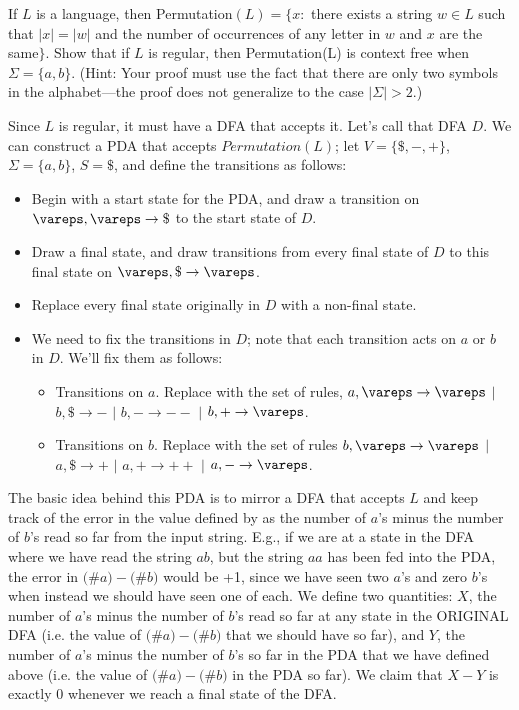 \documentclass[solution, letterpaper]{cs121}
\begin{document}
If $L$ is a language, then {\sc Permutation}$(L) = \{ x:
$ there exists a string $w \in L$ such that $|x|=|w|$ and the number
of occurrences of any letter in $w$ and $x$ are the same$\}$. Show
that if $L$ is regular, then {\sc Permutation}(L) is context free
when $\Sigma = \{a, b\}$. (Hint: Your proof must use the fact that there are only two symbols in the alphabet---the proof does not generalize to the case $\lvert \Sigma\rvert >2$.)

\begin{solution}
Since $L$ is regular, it must have a DFA that accepts it.  Let's call that DFA $D$.  We can construct a PDA that accepts $Permutation(L)$; let $V = \{\$, -, +\}$, $\Sigma = \{a,b\}$, $S = \$$, and define the transitions as follows:
\begin{itemize}
	\setlength\itemsep{0cm}
	\item Begin with a start state for the PDA, and draw a transition on $\vareps, \vareps \rightarrow \$$ to the start state of $D$.
	\item Draw a final state, and draw transitions from every final state of $D$ to this final state on $\vareps, \$ \rightarrow \vareps$.
	\item Replace every final state originally in $D$ with a non-final state.
	\item We need to fix the transitions in $D$; note that each transition acts on $a$ or $b$ in $D$.  We'll fix them as follows:
	\begin{itemize}
		\item Transitions on $a$.  Replace with the set of rules, $a, \vareps \rightarrow \vareps$ $|$ $b, \$ \rightarrow -$ $|$ $b, - \rightarrow --$ $|$ $b, + \rightarrow \vareps$.
		\item Transitions on $b$.  Replace with the set of rules $b, \vareps \rightarrow \vareps$ $|$ $a, \$ \rightarrow +$ $|$ $a, + \rightarrow ++$ $|$ $a, - \rightarrow \vareps$.
	\end{itemize}
\end{itemize}

The basic idea behind this PDA is to mirror a DFA that accepts $L$ and keep track of the error in the value defined by as the number of $a$'s minus the number of $b$'s read so far from the input string.  E.g., if we are at a state in the DFA where we have read the string $ab$, but the string $aa$ has been fed into the PDA, the error in $($\#$a) - ($\#$b)$ would be +1, since we have seen two $a$'s and zero $b$'s when instead we should have seen one of each.  We define two quantities: $X$, the number of $a$'s minus the number of $b$'s read so far at any state in the ORIGINAL DFA (i.e. the value of $($\#$a)-($\#$b)$ that we should have so far), and $Y$, the number of $a$'s minus the number of $b$'s so far in the PDA that we have defined above (i.e. the value of $($\#$a)-($\#$b)$ in the PDA so far).  We claim that $X - Y$ is exactly $0$ whenever we reach a final state of the DFA.


\end{solution}
\end{document}

